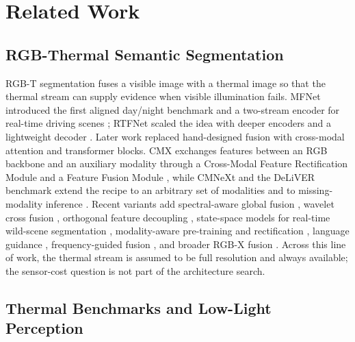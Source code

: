 \section{Related Work}

\subsection{RGB-Thermal Semantic Segmentation}

RGB-T segmentation fuses a visible image with a thermal image so that the thermal
stream can supply evidence when visible illumination fails. MFNet introduced the first
aligned day/night benchmark and a two-stream encoder for real-time driving scenes
\cite{ha2017mfnet}; RTFNet scaled the idea with deeper encoders and a lightweight
decoder \cite{sun2019rtfnet}. Later work replaced hand-designed fusion with
cross-modal attention and transformer blocks. CMX exchanges features between an RGB
backbone and an auxiliary modality through a Cross-Modal Feature Rectification Module
and a Feature Fusion Module \cite{zhang2022crossmodal}, while CMNeXt and the DeLiVER
benchmark extend the recipe to an arbitrary set of modalities and to missing-modality
inference \cite{zhang2023delivering}. Recent variants add spectral-aware global
fusion \cite{zhang2025spectralaware}, wavelet cross fusion \cite{zhang2026waveletcnet},
orthogonal feature decoupling \cite{liu2026orthogonal}, state-space models for
real-time wild-scene segmentation \cite{guo2025crossmodal}, modality-aware
pre-training and rectification \cite{guo2025tuni}, language guidance
\cite{zhao2025unveiling}, frequency-guided fusion \cite{cantez2026frequencyguided},
and broader RGB-X fusion \cite{cao2026multimodal,zhang2026crossweaver,reddy2026seeing,li2026multimodal}. Across this line of
work, the thermal stream is assumed to be full resolution and always available; the
sensor-cost question is not part of the architecture search.

\subsection{Thermal Benchmarks and Low-Light Perception}

